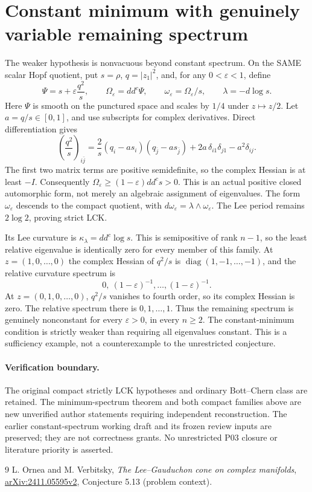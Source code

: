 \documentclass[11pt]{article}
\newcommand{\ddc}{dd^c}
\newcommand{\kap}{\kappa_\lambda}
\theoremstyle{remark}\newtheorem{remark}[theorem]{Remark}
\begin{document}
\section{Constant minimum with genuinely variable remaining spectrum}
The weaker hypothesis is nonvacuous beyond constant spectrum.
On the SAME scalar Hopf quotient, put $s=\rho$, $q=|z_1|^2$,
and, for any $0<\varepsilon<1$, define
\[
 \Psi=s+\varepsilon\frac{q^2}{s},\qquad
 \Omega_\varepsilon=\ddc\Psi,\qquad
 \omega_\varepsilon=\Omega_\varepsilon/s,\qquad
 \lambda=-d\log s.
\]
Here $\Psi$ is smooth on the punctured space and scales by $1/4$
under $z\mapsto z/2$. Let $a=q/s\in[0,1]$, and use subscripts
for complex derivatives. Direct differentiation gives
\[
 \left(\frac{q^2}{s}\right)_{i\bar j}
 =\frac{2}{s}(q_i-a s_i)(q_{\bar j}-a s_{\bar j})
       +2a\,\delta_{i1}\delta_{j1}-a^2\delta_{ij}.
\]
The first two matrix terms are positive semidefinite, so the
complex Hessian is at least $-I$. Consequently
$\Omega_\varepsilon\geq(1-\varepsilon)\ddc s>0$.
This is an actual positive closed automorphic form, not merely
an algebraic assignment of eigenvalues. The form
$\omega_\varepsilon$ descends to the compact quotient, with
$d\omega_\varepsilon=\lambda\wedge\omega_\varepsilon$.
The Lee period remains $2\log2$, proving strict LCK.

Its Lee curvature is $\kap=\ddc\log s$. This is semipositive
of rank $n-1$, so the least relative eigenvalue is identically
zero for every member of this family. At $z=(1,0,\ldots,0)$
the complex Hessian of $q^2/s$ is
$\operatorname{diag}(1,-1,\ldots,-1)$, and the relative
curvature spectrum is
\[
 0,\ (1-\varepsilon)^{-1},\ldots,(1-\varepsilon)^{-1}.
\]
At $z=(0,1,0,\ldots,0)$, $q^2/s$ vanishes to fourth order,
so its complex Hessian is zero. The relative spectrum there
is $0,1,\ldots,1$. Thus the remaining spectrum is genuinely
nonconstant for every $\varepsilon>0$, in every $n\geq2$.
The constant-minimum condition is strictly weaker than requiring
all eigenvalues constant. This is a sufficiency example, not a
counterexample to the unrestricted conjecture.

\paragraph{Verification boundary.}
The original compact strictly LCK hypotheses and ordinary
Bott--Chern class are retained. The minimum-spectrum theorem
and both compact families above are new unverified author
statements requiring independent reconstruction. The earlier
constant-spectrum working draft and its frozen review inputs
are preserved; they are not correctness grants. No unrestricted
P03 closure or literature priority is asserted.

\begin{thebibliography}{9}
 L. Ornea and M. Verbitsky,
\emph{The Lee--Gauduchon cone on complex manifolds},
\href{https://arxiv.org/abs/2411.05595v2}{arXiv:2411.05595v2},
Conjecture 5.13 (problem context).
\end{thebibliography}
\end{document}
